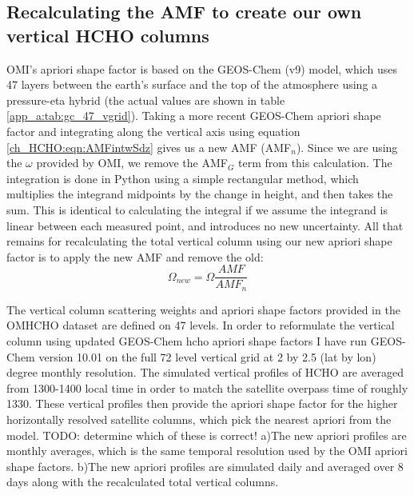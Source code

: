   \subsection{Recalculating the AMF to create our own vertical HCHO columns}
  \label{ch_HCHO:sec:recalculating_AMF_description}
    OMI's apriori shape factor is based on the GEOS-Chem (v9) model, which uses 47 layers between the earth's surface and the top of the atmosphere using a pressure-eta hybrid (the actual values are shown in table \ref{app_a:tab:gc_47_vgrid}).
    Taking a more recent GEOS-Chem apriori shape factor and integrating along the vertical axis using equation \ref{ch_HCHO:eqn:AMFintwSdz} gives us a new AMF (AMF$_n$).
    Since we are using the $\omega$ provided by OMI, we remove the AMF$_G$ term from this calculation.
    The integration is done in Python using a simple rectangular method, which multiplies the integrand midpoints by the change in height, and then takes the sum.
    This is identical to calculating the integral if we assume the integrand is linear between each measured point, and introduces no new uncertainty.
    All that remains for recalculating the total vertical column using our new apriori shape factor is to apply the new AMF and remove the old:
    \begin{equation*}
      \Omega_{new} = \Omega \frac{AMF}{AMF_n}
    \end{equation*}
    
    The vertical column scattering weights and apriori shape factors provided in the OMHCHO dataset are defined on 47 levels.
    In order to reformulate the vertical column using updated GEOS-Chem hcho apriori shape factors I have run GEOS-Chem version 10.01 on the full 72 level vertical grid at 2 by 2.5 (lat by lon) degree monthly resolution. 
    The simulated vertical profiles of HCHO are averaged from 1300-1400 local time in order to match the satellite overpass time of roughly 1330.
    These vertical profiles then provide the apriori shape factor for the higher horizontally resolved satellite columns, which pick the nearest apriori from the model.
    TODO: determine which of these is correct!
    a)The new apriori profiles are monthly averages, which is the same temporal resolution used by the OMI apriori shape factors.
    b)The new apriori profiles are simulated daily and averaged over 8 days along with the recalculated total vertical columns.
    
